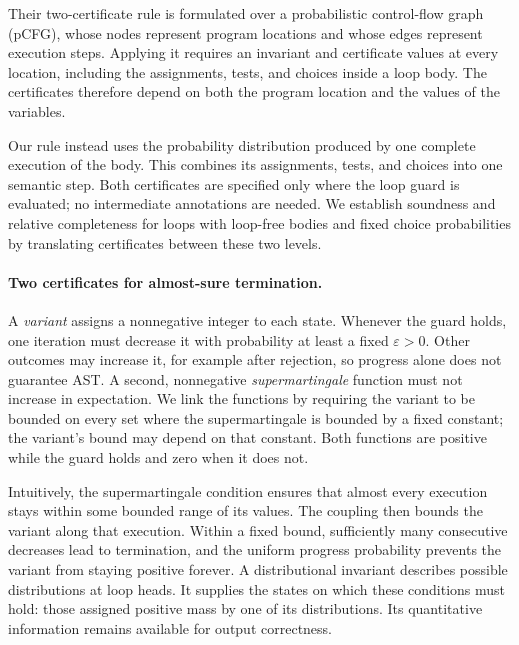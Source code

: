Their two-certificate rule is formulated over a probabilistic control-flow
graph (pCFG), whose nodes represent program locations and whose edges
represent execution steps. Applying it requires an invariant and
certificate values at every location, including the assignments, tests,
and choices inside a loop body. The certificates therefore depend on
both the program location and the values of the variables.

Our rule instead uses the probability distribution produced by one
complete execution of the body. This combines its assignments, tests,
and choices into one semantic step. Both certificates are specified only
where the loop guard is evaluated; no intermediate annotations are needed.
We establish soundness and relative completeness for loops with loop-free
bodies and fixed choice probabilities by translating certificates between
these two levels.

\paragraph{Two certificates for almost-sure termination.}
A \emph{variant} assigns a nonnegative integer to each state. Whenever the
guard holds, one iteration must decrease it with probability at least a
fixed $\varepsilon>0$. Other outcomes may increase it, for example after
rejection, so progress alone does not guarantee AST.
A second, nonnegative \emph{supermartingale} function must not increase in
expectation. We link the functions by requiring the variant to be bounded
on every set where the supermartingale is bounded by a fixed constant;
the variant's bound may depend on that constant. Both functions are
positive while the guard holds and zero when it does not.

Intuitively, the supermartingale condition ensures that almost every
execution stays within some bounded range of its values. The coupling
then bounds the variant along that execution. Within a fixed bound,
sufficiently many consecutive decreases lead to termination, and the
uniform progress probability prevents the variant from staying positive
forever.
A distributional invariant describes possible distributions at loop heads.
It supplies the states on which these conditions must hold: those assigned positive mass by one of its distributions.
Its quantitative information remains available for output correctness.

